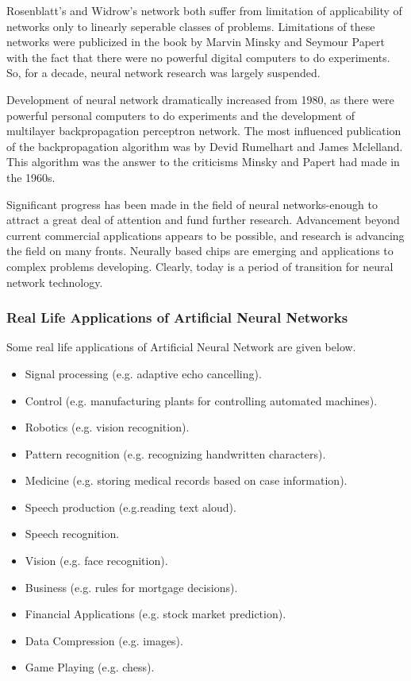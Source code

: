 Rosenblatt’s and Widrow’s network both suffer from limitation of applicability of networks only to linearly seperable classes of problems. Limitations of these networks were publicized in the book by Marvin Minsky and Seymour Papert with the fact that there were no powerful digital computers to do experiments. So, for a decade, neural network research was largely suspended.

Development of neural network dramatically increased from 1980, as there were powerful personal computers to do experiments and the development of multilayer backpropagation perceptron network. The most influenced publication of the backpropagation algorithm was by Devid Rumelhart and James Mclelland. This algorithm was the answer to the criticisms Minsky and Papert had made in the 1960s.

Significant progress has been made in the field of neural networks-enough to attract a great deal of attention and fund further research. Advancement beyond current commercial applications appears to be possible, and research is advancing the field on many fronts. Neurally based chips are emerging and applications to complex problems developing. Clearly, today is a period of transition for neural network technology.
\subsubsection{Real Life Applications of Artificial Neural Networks}
Some real life applications of Artificial Neural Network are given below.

\begin{itemize}
\itemsep0em
\item Signal processing (e.g. adaptive echo cancelling).
\item Control (e.g. manufacturing plants for controlling automated machines).
\item Robotics (e.g. vision recognition).
\item Pattern recognition (e.g. recognizing handwritten characters).
\item Medicine (e.g. storing medical records based on case information).
\item Speech production (e.g.reading text aloud).
\item Speech recognition.
\item Vision (e.g. face recognition).
\item Business (e.g. rules for mortgage decisions).
\item Financial Applications (e.g. stock market prediction).
\item Data Compression (e.g. images).
\item Game Playing (e.g. chess).
\end{itemize}


